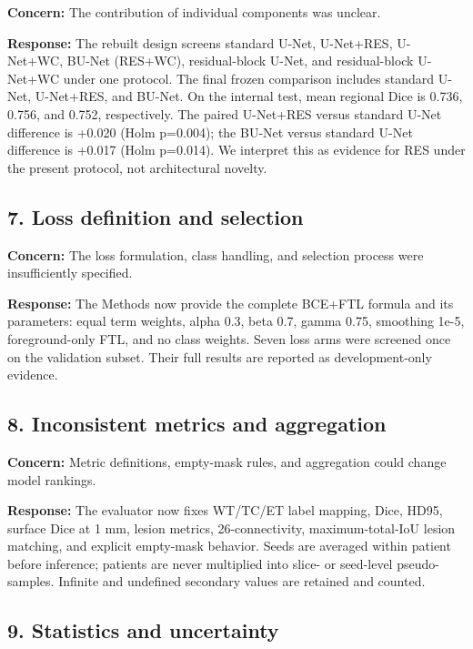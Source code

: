 \documentclass[
  10pt,
  letterpaper,
]{article}
\begin{document}
\textbf{Concern:} The contribution of individual components was unclear.

\textbf{Response:} The rebuilt design screens standard U-Net, U-Net+RES,
U-Net+WC, BU-Net (RES+WC), residual-block U-Net, and residual-block
U-Net+WC under one protocol. The final frozen comparison includes
standard U-Net, U-Net+RES, and BU-Net. On the internal test, mean
regional Dice is 0.736, 0.756, and 0.752, respectively. The paired
U-Net+RES versus standard U-Net difference is +0.020 (Holm p=0.004); the
BU-Net versus standard U-Net difference is +0.017 (Holm p=0.014). We
interpret this as evidence for RES under the present protocol, not
architectural novelty.

\subsection{7. Loss definition and
selection}\label{loss-definition-and-selection}

\textbf{Concern:} The loss formulation, class handling, and selection
process were insufficiently specified.

\textbf{Response:} The Methods now provide the complete BCE+FTL formula
and its parameters: equal term weights, alpha 0.3, beta 0.7, gamma 0.75,
smoothing 1e-5, foreground-only FTL, and no class weights. Seven loss
arms were screened once on the validation subset. Their full results are
reported as development-only evidence.

\subsection{8. Inconsistent metrics and
aggregation}\label{inconsistent-metrics-and-aggregation}

\textbf{Concern:} Metric definitions, empty-mask rules, and aggregation
could change model rankings.

\textbf{Response:} The evaluator now fixes WT/TC/ET label mapping, Dice,
HD95, surface Dice at 1 mm, lesion metrics, 26-connectivity,
maximum-total-IoU lesion matching, and explicit empty-mask behavior.
Seeds are averaged within patient before inference; patients are never
multiplied into slice- or seed-level pseudo-samples. Infinite and
undefined secondary values are retained and counted.

\subsection{9. Statistics and
uncertainty}\label{statistics-and-uncertainty}
\end{document}
